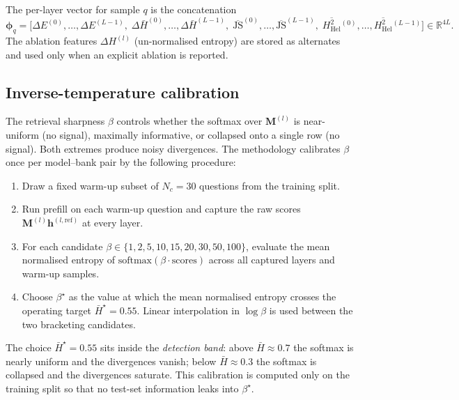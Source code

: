 The per-layer vector for sample $q$ is the concatenation
\begin{equation}
    \boldsymbol{\phi}_q
    =
    \bigl[
        \Delta E^{(0)}, \ldots, \Delta E^{(L-1)},\;
        \Delta \bar{H}^{(0)}, \ldots, \Delta \bar{H}^{(L-1)},\;
        \overline{\mathrm{JS}}^{(0)}, \ldots, \overline{\mathrm{JS}}^{(L-1)},\;
        \overline{H^2_{\mathrm{Hel}}}{}^{(0)}, \ldots, \overline{H^2_{\mathrm{Hel}}}{}^{(L-1)}
    \bigr]
    \in \mathbb{R}^{4L}.
    \label{eq:feature_vector}
\end{equation}
The ablation features $\Delta H^{(l)}$ (un-normalised entropy) are stored
as alternates and used only when an explicit ablation is reported.

\subsection{Inverse-temperature calibration}
\label{subsec:beta_calibration}

The retrieval sharpness $\beta$ controls whether the softmax over
$\mathbf{M}^{(l)}$ is near-uniform (no signal), maximally informative, or
collapsed onto a single row (no signal). Both extremes produce noisy
divergences. The methodology calibrates $\beta$ once per model–bank pair
by the following procedure:

\begin{enumerate}[leftmargin=*]
    \item Draw a fixed warm-up subset of $N_c = 30$ questions from the
          training split.
    \item Run prefill on each warm-up question and capture the raw
          scores $\mathbf{M}^{(l)}\mathbf{h}^{(l,\mathrm{ref})}$ at every
          layer.
    \item For each candidate $\beta \in \{1, 2, 5, 10, 15, 20, 30, 50,
          100\}$, evaluate the mean normalised entropy of
          $\mathrm{softmax}(\beta \cdot \mathrm{scores})$ across all
          captured layers and warm-up samples.
    \item Choose $\beta^\star$ as the value at which the mean normalised
          entropy crosses the operating target
          $\bar{H}^\star = 0.55$. Linear interpolation in
          $\log \beta$ is used between the two bracketing candidates.
\end{enumerate}

The choice $\bar{H}^\star = 0.55$ sits inside the \emph{detection band}:
above $\bar{H} \approx 0.7$ the softmax is nearly uniform and the
divergences vanish; below $\bar{H} \approx 0.3$ the softmax is collapsed
and the divergences saturate. This calibration is computed only on the
training split so that no test-set information leaks into $\beta^\star$.

